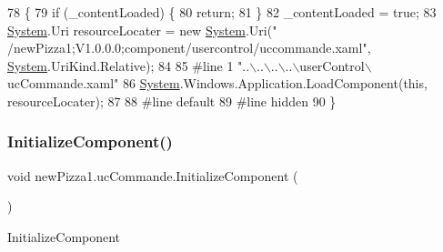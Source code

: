 \begin{DoxyCode}
78                                           \{
79             \textcolor{keywordflow}{if} (\_contentLoaded) \{
80                 \textcolor{keywordflow}{return};
81             \}
82             \_contentLoaded = \textcolor{keyword}{true};
83             \hyperlink{namespaceSystem}{System}.Uri resourceLocater = \textcolor{keyword}{new} \hyperlink{namespaceSystem}{System}.Uri(\textcolor{stringliteral}{"
      /newPizza1;V1.0.0.0;component/usercontrol/uccommande.xaml"}, \hyperlink{namespaceSystem}{System}.UriKind.Relative);
84             
85 \textcolor{preprocessor}{            #line 1 "..\(\backslash\)..\(\backslash\)..\(\backslash\)..\(\backslash\)userControl\(\backslash\)ucCommande.xaml"
}
86             \hyperlink{namespaceSystem}{System}.Windows.Application.LoadComponent(\textcolor{keyword}{this}, resourceLocater);
87             
88 \textcolor{preprocessor}{            #line default
}
89 \textcolor{preprocessor}{            #line hidden
}
90         \}
\end{DoxyCode}
\mbox{\label{classnewPizza1_1_1ucCommande_a3f6251cc87dd9f2a2db45c5413ce1711}} 
\subsubsection{\texorpdfstring{Initialize\+Component()}{InitializeComponent()}\hspace{0.1cm}{\footnotesize\ttfamily [2/6]}}
{\footnotesize\ttfamily void new\+Pizza1.\+uc\+Commande.\+Initialize\+Component (\begin{DoxyParamCaption}{ }\end{DoxyParamCaption})\hspace{0.3cm}{\ttfamily [inline]}}



Initialize\+Component 


